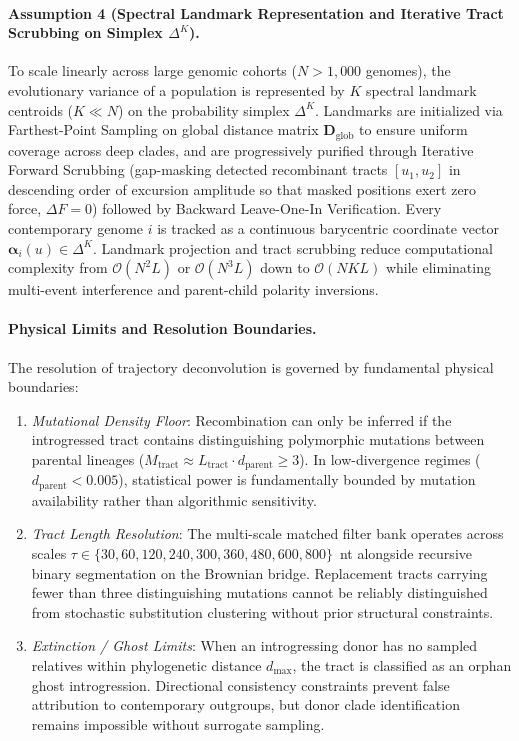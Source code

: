 \paragraph{Assumption 4 (Spectral Landmark Representation and Iterative Tract Scrubbing on Simplex \texorpdfstring{$\Delta^K$}{Delta\textasciicircum K}).}
To scale linearly across large genomic cohorts ($N > 1{,}000$ genomes), the evolutionary variance of a population is represented by $K$ spectral landmark centroids ($K \ll N$) on the probability simplex $\Delta^K$.
Landmarks are initialized via Farthest-Point Sampling \citep{gonzalez1985clustering} on global distance matrix $\mathbf{D}_{\mathrm{glob}}$ to ensure uniform coverage across deep clades, and are progressively purified through Iterative Forward Scrubbing (gap-masking detected recombinant tracts $[u_1, u_2]$ in descending order of excursion amplitude so that masked positions exert zero force, $\Delta F = 0$) followed by Backward Leave-One-In Verification.
Every contemporary genome $i$ is tracked as a continuous barycentric coordinate vector $\bm{\alpha}_i(u) \in \Delta^K$.
Landmark projection and tract scrubbing reduce computational complexity from $\mathcal{O}(N^2 L)$ or $\mathcal{O}(N^3 L)$ down to $\mathcal{O}(N K L)$ while eliminating multi-event interference and parent-child polarity inversions.

\paragraph{Physical Limits and Resolution Boundaries.}
The resolution of trajectory deconvolution is governed by fundamental physical boundaries:
\begin{enumerate}
    \item \emph{Mutational Density Floor}: Recombination can only be inferred if the introgressed tract contains distinguishing polymorphic mutations between parental lineages ($M_{\mathrm{tract}} \approx L_{\mathrm{tract}} \cdot d_{\mathrm{parent}} \ge 3$). In low-divergence regimes ($d_{\mathrm{parent}} < 0.005$), statistical power is fundamentally bounded by mutation availability rather than algorithmic sensitivity.
    \item \emph{Tract Length Resolution}: The multi-scale matched filter bank operates across scales $\tau \in \{30, 60, 120, 240, 300, 360, 480, 600, 800\}$~nt alongside recursive binary segmentation on the Brownian bridge. Replacement tracts carrying fewer than three distinguishing mutations cannot be reliably distinguished from stochastic substitution clustering without prior structural constraints.
    \item \emph{Extinction / Ghost Limits}: When an introgressing donor has no sampled relatives within phylogenetic distance $d_{\mathrm{max}}$, the tract is classified as an orphan ghost introgression. Directional consistency constraints prevent false attribution to contemporary outgroups, but donor clade identification remains impossible without surrogate sampling.
\end{enumerate}

